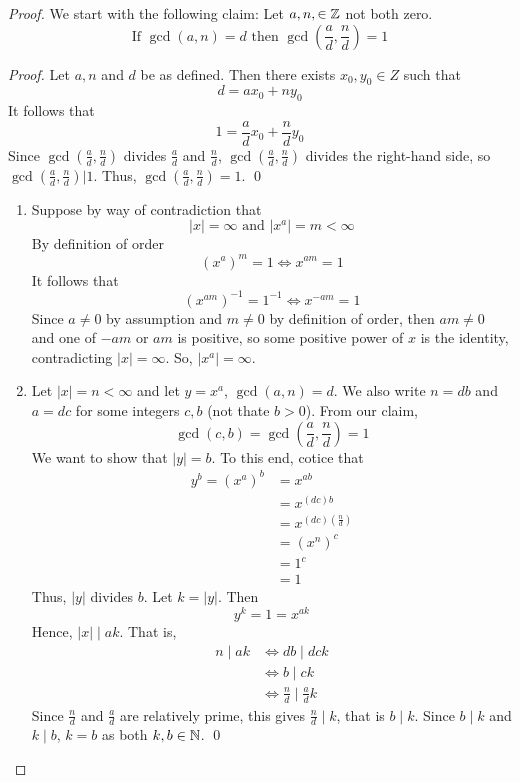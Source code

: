\begin{proof}
    We start with the following claim: Let $a,n, \in \mathbb{Z}$ not both zero.
    $$\text{If $\gcd(a,n) = d$ then $\gcd(\frac{a}{d}, \frac{n}{d})=1$}$$

    \begin{proof}
        Let $a,n$ and $d$ be as defined. Then there exists $x_0, y_0 \in Z$ such that 
        $$d = ax_0 + ny_0$$
        It follows that
        $$1 = \frac{a}{d}x_0 + \frac{n}{d}y_0$$
        Since $\gcd(\frac{a}{d}, \frac{n}{d})$ divides $\frac{a}{d}$ and $\frac{n}{d}$, $\gcd(\frac{a}{d}, \frac{n}{d})$ divides the right-hand side, so $\gcd(\frac{a}{d}, \frac{n}{d}) | 1$. Thus, $\gcd(\frac{a}{d}, \frac{n}{d}) = 1$.
        \qed
    \end{proof}
    \begin{enumerate}
        \item Suppose by way of contradiction that 
        $$|x| = \infty \text{ and } |x^a| = m < \infty$$
        By definition of order
        $$(x^a)^m = 1 \iff x^{am} = 1$$
        It follows that
        $$(x^{am})^{-1} = 1^{-1} \iff x^{-am} = 1$$
        Since $a \not = 0$ by assumption and $m \not = 0$ by definition of order, then $am \not = 0$ and one of $-am$ or $am$ is positive, so some positive power of $x$ is the identity, contradicting $|x| = \infty.$ So, $|x^a| = \infty$.

        \item Let $|x| = n < \infty$ and let $y = x^a$, $\gcd(a,n) = d$. We also write $n = db$ and $a = dc$ for some integers $c, b$ (not thate $ b > 0$). From our claim,
        $$\gcd(c,b) = \gcd(\frac{a}{d}, \frac{n}{d}) = 1$$
        We want to show that $|y| = b$. To this end, cotice that
        \begin{align*}
            y^b = (x^a)^b &= x^{ab} \\
            &= x^{(dc)b} \\ 
            &= x^{(dc)(\frac{n}{d})} \\
            &= (x^n)^c \\ 
            &= 1^c \\
            &= 1
        \end{align*}
        Thus, $|y|$ divides $b$. Let $k = |y|$. Then 
        $$y^k = 1 = x^{ak}$$
        Hence, $|x| \mid ak$. That is, 
        \begin{align*}
            n \mid ak &\iff db \mid dck \\
            &\iff b \mid ck \\
            &\iff \frac{n}{d} \mid \frac{a}{d}k
        \end{align*}
        Since $\frac{n}{d}$ and $\frac{a}{d}$ are relatively prime, this gives $\frac{n}{d} \mid k$, that is $b \mid k$. Since $b \mid k$ and $k \mid b$, $k = b$ as both $k,b \in \mathbb{N}$.
        \qed
    \end{enumerate}
\end{proof}

